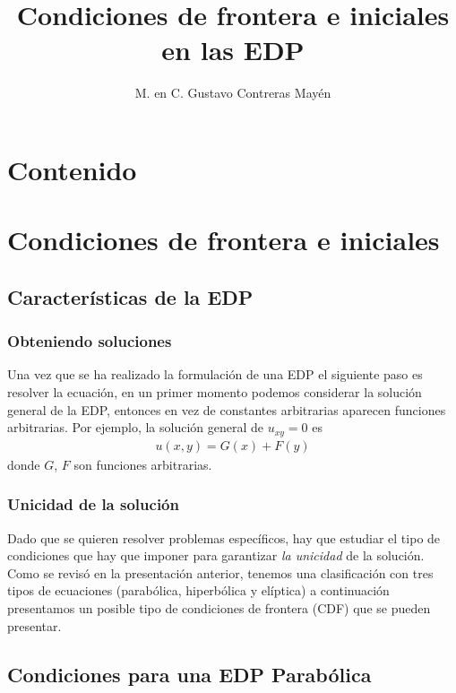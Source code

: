\documentclass[12pt]{beamer}
\date{}
\title{Condiciones de frontera e iniciales en las EDP}
\author{M. en C. Gustavo Contreras Mayén}
\begin{document}
\maketitle
\fontsize{14}{14}\selectfont
{}

\section*{Contenido}


\section{Condiciones de frontera e iniciales}
\subsection{Características de la EDP}

\begin{frame}
\frametitle{Obteniendo soluciones}
Una vez que se ha realizado la formulación de una EDP el siguiente paso es resolver la ecuación, en un primer momento podemos considerar la solución general de la EDP, entonces en vez de constantes arbitrarias aparecen funciones arbitrarias.
\pause
Por ejemplo, la solución general de $u_{xy} = 0$ es 
\begin{align*}
u(x, y) = G(x) + F (y)
\end{align*}
donde $G$, $F$ son funciones arbitrarias.
\end{frame}
\begin{frame}
\frametitle{Unicidad de la solución}
Dado que se quieren resolver problemas específicos, hay que estudiar el tipo de condiciones que hay que imponer para garantizar \emph{la unicidad} de la solución.
\\
\bigskip
\pause
Como se revisó en la presentación anterior, tenemos una clasificación con tres tipos de ecuaciones (parabólica, hiperbólica y elíptica) a continuación presentamos un posible tipo de condiciones de frontera (CDF) que se pueden presentar.
\end{frame}

\subsection{Condiciones para una EDP Parabólica}
\end{document}

